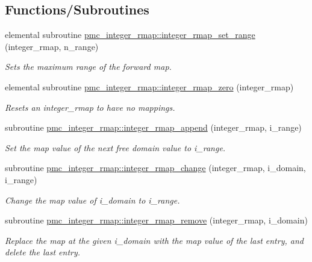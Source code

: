 \subsection*{Functions/\+Subroutines}
\begin{DoxyCompactItemize}
\item 
elemental subroutine \mbox{\hyperlink{namespacepmc__integer__rmap_a8e55a1b6d41e1cec7c05c2f2f89e2603}{pmc\+\_\+integer\+\_\+rmap\+::integer\+\_\+rmap\+\_\+set\+\_\+range}} (integer\+\_\+rmap, n\+\_\+range)
\begin{DoxyCompactList}\small\item\em Sets the maximum range of the forward map. \end{DoxyCompactList}\item 
elemental subroutine \mbox{\hyperlink{namespacepmc__integer__rmap_a16f57781b90da0777f54a2070b3f4bc4}{pmc\+\_\+integer\+\_\+rmap\+::integer\+\_\+rmap\+\_\+zero}} (integer\+\_\+rmap)
\begin{DoxyCompactList}\small\item\em Resets an integer\+\_\+rmap to have no mappings. \end{DoxyCompactList}\item 
subroutine \mbox{\hyperlink{namespacepmc__integer__rmap_a0f7f546f381ee5750d589783bb7e1d89}{pmc\+\_\+integer\+\_\+rmap\+::integer\+\_\+rmap\+\_\+append}} (integer\+\_\+rmap, i\+\_\+range)
\begin{DoxyCompactList}\small\item\em Set the map value of the next free domain value to {\ttfamily i\+\_\+range}. \end{DoxyCompactList}\item 
subroutine \mbox{\hyperlink{namespacepmc__integer__rmap_aab0f22157b45282c06a9c96132755c36}{pmc\+\_\+integer\+\_\+rmap\+::integer\+\_\+rmap\+\_\+change}} (integer\+\_\+rmap, i\+\_\+domain, i\+\_\+range)
\begin{DoxyCompactList}\small\item\em Change the map value of {\ttfamily i\+\_\+domain} to {\ttfamily i\+\_\+range}. \end{DoxyCompactList}\item 
subroutine \mbox{\hyperlink{namespacepmc__integer__rmap_a01351bbea0a74eb2a4b0f970cbb4ae85}{pmc\+\_\+integer\+\_\+rmap\+::integer\+\_\+rmap\+\_\+remove}} (integer\+\_\+rmap, i\+\_\+domain)
\begin{DoxyCompactList}\small\item\em Replace the map at the given {\ttfamily i\+\_\+domain} with the map value of the last entry, and delete the last entry. \end{DoxyCompactList}\item 

\end{DoxyCompactItemize}
